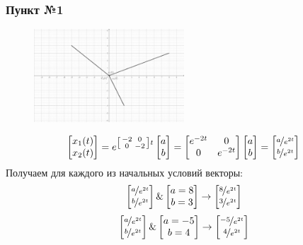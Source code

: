 \documentclass[a3paper,14pt]{extarticle}
\begin{document}
\subsubsection*{Пункт №1}
\begin{figure}
    \centering
    \includegraphics[width=0.5\textwidth]{2.1.png}
\end{figure}
$$\begin{bmatrix}
    x_1(t) \\ x_2(t)
\end{bmatrix} = e^{\left[\begin{smallmatrix}
    -2 & 0 \\ 0 & -2
\end{smallmatrix}\right]t}\begin{bmatrix}
    a \\ b
\end{bmatrix} = \begin{bmatrix}
    e^{-2t} & 0 \\ 0 & e^{-2t}
\end{bmatrix}\begin{bmatrix}
    a \\ b
\end{bmatrix} = \begin{bmatrix}
    \nicefrac{a}{e^{2t}} \\ \nicefrac{b}{e^{2t}}
\end{bmatrix}$$
Получаем для каждого из начальных условий векторы: $$\begin{bmatrix}
    \nicefrac{a}{e^{2t}} \\ \nicefrac{b}{e^{2t}}
\end{bmatrix} \& \begin{bmatrix}
    a = 8 \\ b = 3
\end{bmatrix} \rightarrow \begin{bmatrix}
    \nicefrac{8}{e^{2t}} \\ \nicefrac{3}{e^{2t}}
\end{bmatrix}$$$$\begin{bmatrix}
    \nicefrac{a}{e^{2t}} \\ \nicefrac{b}{e^{2t}}
\end{bmatrix} \& \begin{bmatrix}
    a=-5 \\b= 4
\end{bmatrix} \rightarrow \begin{bmatrix}
    \nicefrac{-5}{e^{2t}} \\ \nicefrac{4}{e^{2t}}
\end{bmatrix}$$
\end{document}

